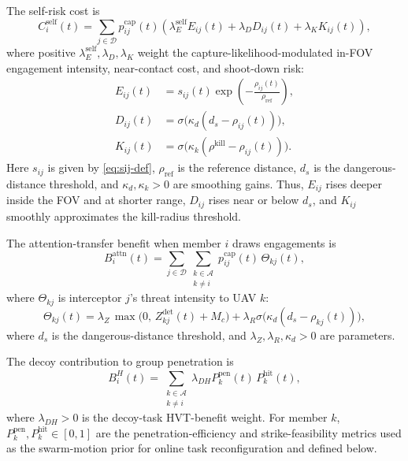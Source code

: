 \documentclass[unbranded]{cja}
\begin{document}
The self-risk cost is
\begin{equation}
C_i^{\mathrm{self}}(t)
=
\sum_{j\in\mathcal{D}}
p_{ij}^{\mathrm{cap}}(t)
\left(
\lambda_E^{\mathrm{self}} E_{ij}(t)
+
\lambda_D D_{ij}(t)
+
\lambda_K K_{ij}(t)
\right),
\end{equation}
where positive $\lambda_E^{\mathrm{self}},\lambda_D,\lambda_K$ weight the capture-likelihood-modulated in-FOV engagement intensity, near-contact cost, and shoot-down risk:
\begin{equation}
\begin{aligned}
E_{ij}(t)
&=s_{ij}(t)\exp\!\left(-\frac{\rho_{ij}(t)}{\rho_{\mathrm{ref}}}\right),\\
D_{ij}(t)
&=\sigma\!\bigl(\kappa_d(d_s-\rho_{ij}(t))\bigr),\\
K_{ij}(t)
&=\sigma\!\bigl(\kappa_k(\rho^{\mathrm{kill}}-\rho_{ij}(t))\bigr).
\end{aligned}
\end{equation}
Here $s_{ij}$ is given by \eqref{eq:sij-def}, $\rho_{\mathrm{ref}}$ is the reference distance, $d_s$ is the dangerous-distance threshold, and $\kappa_d,\kappa_k>0$ are smoothing gains. Thus, $E_{ij}$ rises deeper inside the FOV and at shorter range, $D_{ij}$ rises near or below $d_s$, and $K_{ij}$ smoothly approximates the kill-radius threshold.

The attention-transfer benefit when member $i$ draws engagements is
\begin{equation}
B_i^{\mathrm{attn}}(t)
=
\sum_{j\in\mathcal{D}}
\sum_{\substack{k\in\mathcal{A}\\k\neq i}}
p_{ij}^{\mathrm{cap}}(t)\,\Theta_{kj}(t),
\end{equation}
where $\Theta_{kj}$ is interceptor $j$'s threat intensity to UAV $k$:
\begin{equation}
\Theta_{kj}(t)
=
\lambda_Z\,\max\bigl(0,\, Z_{kj}^{\mathrm{det}}(t)+M_c\bigr)
+
\lambda_R \sigma\!\bigl(\kappa_d(d_s-\rho_{kj}(t))\bigr),
\end{equation}
where $d_s$ is the dangerous-distance threshold, and $\lambda_Z,\lambda_R,\kappa_d>0$ are parameters.

The decoy contribution to group penetration is
\begin{equation}
B_i^{H}(t)
=
\sum_{\substack{k\in\mathcal{A}\\k\neq i}}
\lambda_{DH} P_k^{\mathrm{pen}}(t)\,P_k^{\mathrm{hit}}(t),
\end{equation}
where $\lambda_{DH}>0$ is the decoy-task HVT-benefit weight. For member $k$, $P_k^{\mathrm{pen}},P_k^{\mathrm{hit}}\in[0,1]$ are the penetration-efficiency and strike-feasibility metrics used as the swarm-motion prior for online task reconfiguration and defined below.
\end{document}
